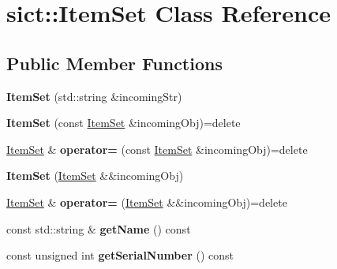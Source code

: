 \hypertarget{classsict_1_1ItemSet}{}\section{sict\+::Item\+Set Class Reference}
\label{classsict_1_1ItemSet}
\subsection*{Public Member Functions}
\begin{DoxyCompactItemize}
\item 
\mbox{\label{classsict_1_1ItemSet_ae90c48652022bb74c04774fe0b59eadc}} 
{\bfseries Item\+Set} (std\+::string \&incoming\+Str)
\item 
\mbox{\label{classsict_1_1ItemSet_ac5814fc09385ea14c8776fd3d9920d16}} 
{\bfseries Item\+Set} (const \mbox{\hyperlink{classsict_1_1ItemSet}{Item\+Set}} \&incoming\+Obj)=delete
\item 
\mbox{\label{classsict_1_1ItemSet_a76155437cf9aef0adf0b26ed44383b85}} 
\mbox{\hyperlink{classsict_1_1ItemSet}{Item\+Set}} \& {\bfseries operator=} (const \mbox{\hyperlink{classsict_1_1ItemSet}{Item\+Set}} \&incoming\+Obj)=delete
\item 
\mbox{\label{classsict_1_1ItemSet_a5efb673bc5cad8a35404fef1dd43a78b}} 
{\bfseries Item\+Set} (\mbox{\hyperlink{classsict_1_1ItemSet}{Item\+Set}} \&\&incoming\+Obj)
\item 
\mbox{\label{classsict_1_1ItemSet_ae3b1dbf59c6fd7cf463459290c0421da}} 
\mbox{\hyperlink{classsict_1_1ItemSet}{Item\+Set}} \& {\bfseries operator=} (\mbox{\hyperlink{classsict_1_1ItemSet}{Item\+Set}} \&\&incoming\+Obj)=delete
\item 
\mbox{\label{classsict_1_1ItemSet_a5182b65c6ac91c27a125641139b448cd}} 
const std\+::string \& {\bfseries get\+Name} () const
\item 
\mbox{\label{classsict_1_1ItemSet_ab67dbc2189195da464da446dad1238a9}} 
const unsigned int {\bfseries get\+Serial\+Number} () const
\item 
\mbox{\label{classsict_1_1ItemSet_a207ec2d18000dba292c70b34617917d0}} 

\end{DoxyCompactItemize}
